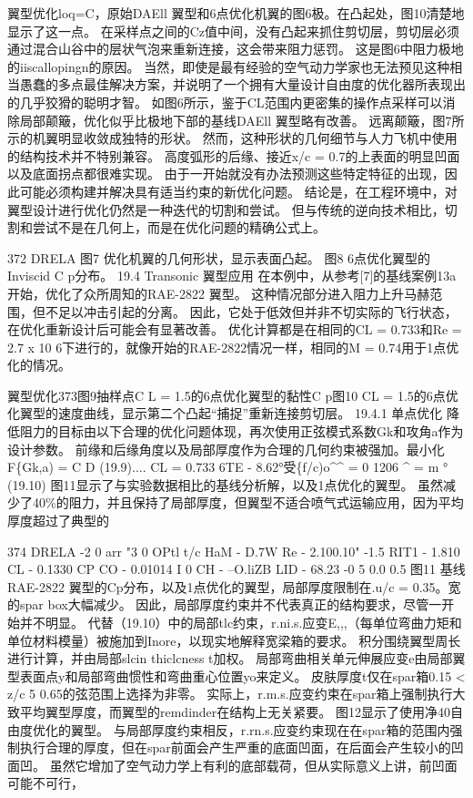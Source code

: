 \documentclass[UTF8,11pt,a4paper,openany,fontset=fandol]{ctexbook}
\begin{document}
翼型优化loq=C，原始DAEll 翼型和6点优化机翼的图6极。在凸起处，图10清楚地显示了这一点。 在采样点之间的Cz值中间，没有凸起来抓住剪切层，剪切层必须通过混合山谷中的层状气泡来重新连接，这会带来阻力惩罚。 这是图6中阻力极地的iiscallopingn的原因。 当然，即使是最有经验的空气动力学家也无法预见这种相当愚蠢的多点最佳解决方案，并说明了一个拥有大量设计自由度的优化器所表现出的几乎狡猾的聪明才智。 如图6所示，鉴于CL范围内更密集的操作点采样可以消除局部颠簸，优化似乎比极地下部的基线DAEll 翼型略有改善。 远离颠簸，图7所示的机翼明显收敛成独特的形状。 然而，这种形状的几何细节与人力飞机中使用的结构技术并不特别兼容。 高度弧形的后缘、接近x/c = 0.7的上表面的明显凹面以及底面拐点都很难实现。 由于一开始就没有办法预测这些特定特征的出现，因此可能必须构建并解决具有适当约束的新优化问题。 结论是，在工程环境中，对翼型设计进行优化仍然是一种迭代的切割和尝试。 但与传统的逆向技术相比，切割和尝试不是在几何上，而是在优化问题的精确公式上。

372 DRELA 图7 优化机翼的几何形状，显示表面凸起。 图8 6点优化翼型的Inviscid C p分布。 19.4 Transonic 翼型应用 在本例中，从参考[7]的基线案例13a开始，优化了众所周知的RAE-2822 翼型。 这种情况部分进入阻力上升马赫范围，但不足以冲击引起的分离。 因此，它处于低效但并非不切实际的飞行状态，在优化重新设计后可能会有显著改善。 优化计算都是在相同的CL = 0.733和Re = 2.7 x 10 6下进行的，就像开始的RAE-2822情况一样，相同的M = 0.74用于1点优化的情况。

翼型优化373图9抽样点C L = 1.5的6点优化翼型的黏性C p图10 CL = 1.5的6点优化翼型的速度曲线，显示第二个凸起“捕捉”重新连接剪切层。 19.4.1 单点优化 降低阻力的目标由以下合理的优化问题体现，再次使用正弦模式系数Gk和攻角a作为设计参数。 前缘和后缘角度以及局部厚度作为合理的几何约束被强加。最小化F\{Gk,a) = C D (19.9).... CL = 0.733 6TE - 8.62°受\{f/c)o\textasciicircum{}\textasciicircum{} = 0 1206 \textasciicircum{} = m ° (19.10) 图11显示了与实验数据相比的基线分析解，以及1点优化的翼型。 虽然减少了40\%的阻力，并且保持了局部厚度，但翼型不适合喷气式运输应用，因为平均厚度超过了典型的

374 DRELA -2 0 arr "3 0 OPtl t/c HaM - D.7W Re - 2.100.10" -1.5 RIT1 - 1.810 CL - 0.1330 CP CO - 0.01014 I 0 CH - --O.liZB LID - 68.23 -0 5 0.0 0.5 图11 基线RAE-2822 翼型的Cp分布，以及1点优化的翼型，局部厚度限制在.u/c = 0.35。宽的spar box大幅减少。 因此，局部厚度约束并不代表真正的结构要求，尽管一开始并不明显。 代替（19.10）中的局部tlc约束，r.ni.s.应变E,,,（每单位弯曲力矩和单位材料模量）被施加到Inore，以现实地解释宽梁箱的要求。 积分围绕翼型周长进行计算，并由局部slcin thiclcness t加权。 局部弯曲相关单元伸展应变e由局部翼型表面点y和局部弯曲惯性和弯曲重心位置yo来定义。 皮肤厚度t仅在spar箱0.15 < z/c 5 0.65的弦范围上选择为非零。 实际上，r.m.s.应变约束在spar箱上强制执行大致平均翼型厚度，而翼型的remdinder在结构上无关紧要。 图12显示了使用净40自由度优化的翼型。 与局部厚度约束相反，r.rn.s.应变约束现在在spar箱的范围内强制执行合理的厚度，但在spar前面会产生严重的底面凹面，在后面会产生较小的凹面凹。 虽然它增加了空气动力学上有利的底部载荷，但从实际意义上讲，前凹面可能不可行，
\end{document}
